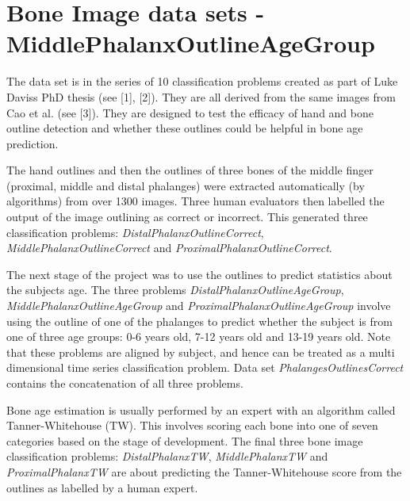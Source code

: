 \chapter{Bone Image data sets -\/ Middle\+Phalanx\+Outline\+Age\+Group}
\hypertarget{md_external_2data_2UCRArchive__2018_2MiddlePhalanxOutlineAgeGroup_2README}{}\label{md_external_2data_2UCRArchive__2018_2MiddlePhalanxOutlineAgeGroup_2README}
\label{md_external_2data_2UCRArchive__2018_2MiddlePhalanxOutlineAgeGroup_2README_autotoc_md145}%
%
 The data set is in the series of 10 classification problems created as part of Luke Davis\textquotesingle{}s PhD thesis (see \mbox{[}1\mbox{]}, \mbox{[}2\mbox{]}). They are all derived from the same images from Cao et al. (see \mbox{[}3\mbox{]}). They are designed to test the efficacy of hand and bone outline detection and whether these outlines could be helpful in bone age prediction.

The hand outlines and then the outlines of three bones of the middle finger (proximal, middle and distal phalanges) were extracted automatically (by algorithms) from over 1300 images. Three human evaluators then labelled the output of the image outlining as correct or incorrect. This generated three classification problems\+: {\itshape Distal\+Phalanx\+Outline\+Correct}, {\itshape Middle\+Phalanx\+Outline\+Correct} and {\itshape Proximal\+Phalanx\+Outline\+Correct}.

The next stage of the project was to use the outlines to predict statistics about the subjects age. The three problems {\itshape Distal\+Phalanx\+Outline\+Age\+Group}, {\itshape Middle\+Phalanx\+Outline\+Age\+Group} and {\itshape Proximal\+Phalanx\+Outline\+Age\+Group} involve using the outline of one of the phalanges to predict whether the subject is from one of three age groups\+: 0-\/6 years old, 7-\/12 years old and 13-\/19 years old. Note that these problems are aligned by subject, and hence can be treated as a multi dimensional time series classification problem. Data set {\itshape Phalanges\+Outlines\+Correct} contains the concatenation of all three problems.

Bone age estimation is usually performed by an expert with an algorithm called Tanner-\/\+Whitehouse (TW). This involves scoring each bone into one of seven categories based on the stage of development. The final three bone image classification problems\+: {\itshape Distal\+Phalanx\+TW}, {\itshape Middle\+Phalanx\+TW} and {\itshape Proximal\+Phalanx\+TW} are about predicting the Tanner-\/\+Whitehouse score from the outlines as labelled by a human expert.

